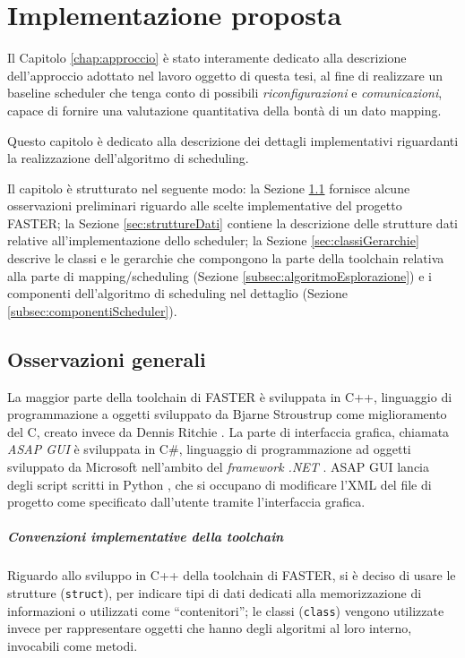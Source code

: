 \chapter{Implementazione proposta}
\label{chap:implementazione}
\vspace{1cm}
Il Capitolo \ref{chap:approccio} è stato interamente dedicato alla descrizione 
dell'approccio adottato nel lavoro oggetto di questa tesi, al fine di 
realizzare un baseline scheduler che tenga conto di possibili 
\emph{riconfigurazioni} e \emph{comunicazioni}, capace di fornire una 
valutazione quantitativa della bontà di un dato mapping.

Questo capitolo è dedicato alla descrizione dei dettagli implementativi 
riguardanti la realizzazione dell'algoritmo di scheduling.

Il capitolo è strutturato nel seguente modo: la Sezione 
\ref{sec:osservazioniGenerali} fornisce alcune osservazioni preliminari 
riguardo alle scelte implementative del progetto \ac{FASTER}; la Sezione 
\ref{sec:struttureDati} contiene la descrizione delle strutture dati relative 
all'implementazione dello scheduler; la Sezione \ref{sec:classiGerarchie} 
descrive le classi e le gerarchie che compongono la parte della toolchain 
relativa alla parte di mapping/scheduling (Sezione 
\ref{subsec:algoritmoEsplorazione}) e i componenti dell'algoritmo di scheduling 
nel dettaglio (Sezione \ref{subsec:componentiScheduler}).


\section{Osservazioni generali}
\label{sec:osservazioniGenerali}
La maggior parte della toolchain di \ac{FASTER} è sviluppata in C++, 
linguaggio di programmazione a oggetti sviluppato da Bjarne Stroustrup 
\cite{CppStroustrup} come miglioramento del C, creato invece da Dennis Ritchie 
\cite{CKernighanRitchie}. La parte di interfaccia grafica, chiamata \emph{ASAP 
GUI} è sviluppata in C\#, linguaggio di programmazione ad oggetti sviluppato da 
Microsoft nell'ambito del \emph{framework .NET} \cite{ProCSharp}. ASAP GUI 
lancia degli script scritti in Python \cite{ThinkPython}, che si occupano di 
modificare l'XML del file di progetto come specificato dall'utente tramite 
l'interfaccia grafica.
\paragraph{Convenzioni implementative della toolchain}
Riguardo allo sviluppo in C++ della toolchain di \ac{FASTER}, si è deciso di 
usare le strutture (\verb+struct+), per indicare tipi di dati dedicati alla 
memorizzazione di informazioni o utilizzati come ``contenitori''; le classi 
(\verb+class+) vengono utilizzate invece per rappresentare oggetti che hanno 
degli algoritmi al loro interno, invocabili come metodi.

